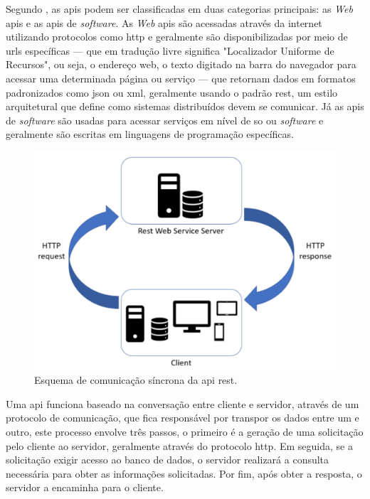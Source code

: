 Segundo \cite{martin2008codigolimpo}, as \acp{api} podem ser classificadas em duas categorias principais: as \textit{Web} \acp{api} e as \acp{api} de \textit{software}. As \textit{Web} \acp{api} são acessadas através da internet utilizando protocolos como \ac{http} e geralmente são disponibilizadas por meio de \acp{url} específicas — que em tradução livre significa "Localizador Uniforme de Recursos", ou seja, o endereço web, o texto digitado na barra do navegador para acessar uma determinada página ou serviço — que retornam dados em formatos padronizados como \ac{json} ou \ac{xml}, geralmente usando o padrão \ac{rest}, um estilo arquitetural que define como sistemas distribuídos devem se comunicar. Já as \acp{api} de \textit{software} são usadas para acessar serviços em nível de \ac{so} ou \textit{software} e geralmente são escritas em linguagens de programação específicas.

\begin{figure}[H]
\centering
  \includegraphics[width=\columnwidth]{images/REST-API-synchronous-communication-schema.pdf}
  \caption{Esquema de comunicação síncrona da \ac{api} \ac{rest}.}
  \label{fig:REST-API}
\end{figure}

Uma \ac{api} funciona baseado na conversação entre cliente e servidor, através de um protocolo de comunicação, que fica responsável por transpor os dados entre um e outro, este processo envolve três passos, o primeiro é a geração de uma solicitação pelo cliente ao servidor, geralmente através do protocolo \ac{http}. Em seguida, se a solicitação exigir acesso ao banco de dados, o servidor realizará a consulta necessária para obter as informações solicitadas. Por fim, após obter a resposta, o servidor a encaminha para o cliente.


